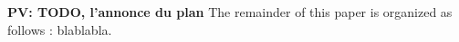 \documentclass{Styles/llncs}
\newcommand{\PV}[1]{{\color{purple}\bfseries PV: #1}}
\begin{document}

\PV{TODO, l'annonce du plan}
The remainder of this paper is organized as follows : blablabla.

%
\end{document}

